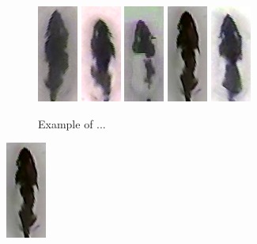 \documentclass[conference]{IEEEtran}
\begin{document}
\begin{figure}[h]
\includegraphics[scale=0.9]{dataset/1.png}
\includegraphics[scale=0.9]{dataset/3.png}
\includegraphics[scale=0.9]{dataset/4.png}
\includegraphics[scale=0.9]{dataset/5.png}
\includegraphics[scale=0.9]{dataset/7.png}
\caption{Example of ...}

\end{figure}

\includegraphics[scale=0.9]{dataset/5.png}
\end{document}
